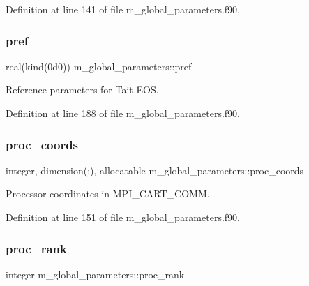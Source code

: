 Definition at line 141 of file m\+\_\+global\+\_\+parameters.\+f90.

\mbox{\label{namespacem__global__parameters_aae2170af8a68c7dcdd91910aad867ef4}} 
\subsubsection{\texorpdfstring{pref}{pref}}
{\footnotesize\ttfamily real(kind(0d0)) m\+\_\+global\+\_\+parameters\+::pref}



Reference parameters for Tait E\+OS. 



Definition at line 188 of file m\+\_\+global\+\_\+parameters.\+f90.

\mbox{\label{namespacem__global__parameters_a48dea2bc17c5e4465a444c926070ae9b}} 
\subsubsection{\texorpdfstring{proc\+\_\+coords}{proc\_coords}}
{\footnotesize\ttfamily integer, dimension(\+:), allocatable m\+\_\+global\+\_\+parameters\+::proc\+\_\+coords}



Processor coordinates in M\+P\+I\+\_\+\+C\+A\+R\+T\+\_\+\+C\+O\+MM. 



Definition at line 151 of file m\+\_\+global\+\_\+parameters.\+f90.

\mbox{\label{namespacem__global__parameters_a383c6ff025d4ea09ddd4e2356042d86b}} 
\subsubsection{\texorpdfstring{proc\+\_\+rank}{proc\_rank}}
{\footnotesize\ttfamily integer m\+\_\+global\+\_\+parameters\+::proc\+\_\+rank}



